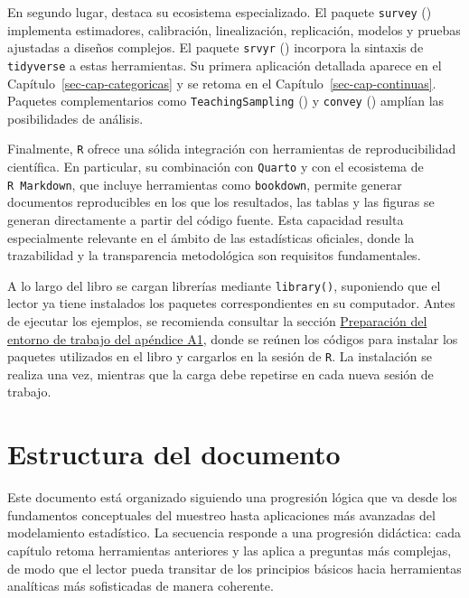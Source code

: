\documentclass[
  spanish,
  11pt,
  letterpaper,
  oneside,
  open=any]{scrbook}
\begin{document}
En segundo lugar, destaca su ecosistema especializado. El paquete
\texttt{survey} ()
implementa estimadores, calibración, linealización, replicación, modelos
y pruebas ajustadas a diseños complejos. El paquete \texttt{srvyr}
()
incorpora la sintaxis de \texttt{tidyverse} a estas herramientas. Su
primera aplicación detallada aparece en el
Capítulo~\ref{sec-cap-categoricas} y se retoma en el
Capítulo~\ref{sec-cap-continuas}. Paquetes complementarios como
\texttt{TeachingSampling} () y \texttt{convey} ()
amplían las posibilidades de análisis.

Finalmente, \texttt{R} ofrece una sólida integración con herramientas de
reproducibilidad científica. En particular, su combinación con
\texttt{Quarto} y con el ecosistema de \texttt{R\ Markdown}, que incluye
herramientas como \texttt{bookdown}, permite generar documentos
reproducibles en los que los resultados, las tablas y las figuras se
generan directamente a partir del código fuente. Esta capacidad resulta
especialmente relevante en el ámbito de las estadísticas oficiales,
donde la trazabilidad y la transparencia metodológica son requisitos
fundamentales.

A lo largo del libro se cargan librerías mediante \texttt{library()},
suponiendo que el lector ya tiene instalados los paquetes
correspondientes en su computador. Antes de ejecutar los ejemplos, se
recomienda consultar la sección
\hyperref[preparacion-del-entorno-de-trabajo]{Preparación del entorno de
trabajo del apéndice A1}, donde se reúnen los códigos para instalar los
paquetes utilizados en el libro y cargarlos en la sesión de \texttt{R}.
La instalación se realiza una vez, mientras que la carga debe repetirse
en cada nueva sesión de trabajo.

\section{Estructura del documento}\label{estructura-del-documento}

Este documento está organizado siguiendo una progresión lógica que va
desde los fundamentos conceptuales del muestreo hasta aplicaciones más
avanzadas del modelamiento estadístico. La secuencia responde a una
progresión didáctica: cada capítulo retoma herramientas anteriores y las
aplica a preguntas más complejas, de modo que el lector pueda transitar
de los principios básicos hacia herramientas analíticas más sofisticadas
de manera coherente.
\end{document}
